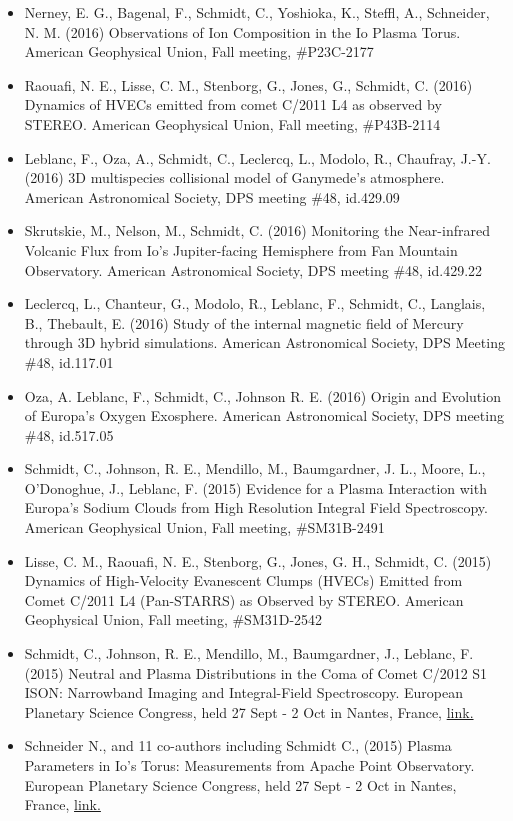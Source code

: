 \documentclass[12pt]{report}
\begin{document}
\begin{itemize}
   \item Nerney, E. G., Bagenal, F., Schmidt, C., Yoshioka, K., Steffl, A., Schneider, N. M. (2016) Observations of Ion Composition in the Io Plasma Torus. American Geophysical Union, Fall meeting, \#P23C-2177
   \item Raouafi, N. E., Lisse, C. M., Stenborg, G., Jones, G., Schmidt, C. (2016) Dynamics of HVECs emitted from comet C/2011 L4 as observed by STEREO. American Geophysical Union, Fall meeting, \#P43B-2114
   \item Leblanc, F., Oza, A., Schmidt, C., Leclercq, L., Modolo, R., Chaufray, J.-Y. (2016) 3D multispecies collisional model of Ganymede's atmosphere. American Astronomical Society, DPS meeting \#48, id.429.09
   \item Skrutskie, M., Nelson, M., Schmidt, C. (2016) Monitoring the Near-infrared Volcanic Flux from Io's Jupiter-facing Hemisphere from Fan Mountain Observatory. American Astronomical Society, DPS meeting \#48, id.429.22
   \item Leclercq, L., Chanteur, G., Modolo, R., Leblanc, F., Schmidt, C., Langlais, B., Thebault, E. (2016) Study of the internal magnetic field of Mercury through 3D hybrid simulations. American Astronomical Society, DPS Meeting \#48, id.117.01
   \item Oza, A. Leblanc, F., Schmidt, C., Johnson R. E. (2016) Origin and Evolution of Europa's Oxygen Exosphere. American Astronomical Society, DPS meeting \#48, id.517.05
   \item Schmidt, C., Johnson, R. E., Mendillo, M., Baumgardner, J. L., Moore, L., O'Donoghue, J., Leblanc, F. (2015) Evidence for a Plasma Interaction with Europa's Sodium Clouds from High Resolution Integral Field Spectroscopy. American Geophysical Union, Fall meeting, \#SM31B-2491
   \item Lisse, C. M., Raouafi, N. E., Stenborg, G., Jones, G. H., Schmidt, C. (2015) Dynamics of High-Velocity Evanescent Clumps (HVECs) Emitted from Comet C/2011 L4 (Pan-STARRS) as Observed by STEREO. American Geophysical Union, Fall meeting, \#SM31D-2542
   \item Schmidt, C., Johnson, R. E., Mendillo, M., Baumgardner, J., Leblanc, F. (2015) Neutral and Plasma Distributions in the Coma of Comet C/2012 S1 ISON: Narrowband Imaging and Integral-Field Spectroscopy. European Planetary Science Congress, held 27 Sept - 2 Oct in Nantes, France, \href{https://meetingorganizer.copernicus.org/EPSC2015/EPSC2015-315-2.pdf}{link.} 
   \item Schneider N., and 11 co-authors including Schmidt C., (2015) Plasma Parameters in Io's Torus: Measurements from Apache Point Observatory. European Planetary Science Congress, held 27 Sept - 2 Oct in Nantes, France, \href{https://meetingorganizer.copernicus.org/EPSC2015/EPSC2015-418-1.pdf}{link.} 

\end{itemize}
\end{document}
